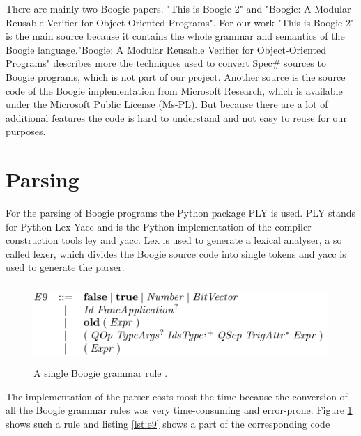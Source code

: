 \documentclass[paper=a4, fontsize=12pt]{scrartcl}
\begin{document}
There are mainly two Boogie papers. "This is Boogie 2"\cite{boogie2} and "Boogie: A Modular Reusable Verifier for Object-Oriented Programs"\cite{boogie}. For our work "This is Boogie 2" is the main source because it contains the whole grammar and semantics of the Boogie language."Boogie: A Modular Reusable Verifier for Object-Oriented Programs" describes more the techniques used to convert Spec\# sources to Boogie programs, which is not part of our project. Another source is the source code of the Boogie implementation from Microsoft Research, which is available under the Microsoft Public License (Ms-PL). But because there are a lot of additional features the code is hard to understand and not easy to reuse for our purposes.

\section{Parsing}
For the parsing of Boogie programs the Python package PLY is used. PLY stands for Python Lex-Yacc and is the Python implementation of the compiler construction tools ley and yacc. Lex is used to generate a lexical analyser, a so called lexer, which divides the Boogie source code into single tokens and yacc is used to generate the parser. 

\begin{figure}[ht]
  \centering
    \includegraphics[height=3cm]{e9}
    \caption{A single Boogie grammar rule \cite{boogie2}.}
  \label{fig:e9}
\end{figure}

The implementation of the parser costs most the time because the conversion of all the Boogie grammar rules was very time-consuming and error-prone. Figure \ref{fig:e9} shows such a rule and listing \ref{lst:e9} shows a part of the corresponding code
\end{document}
